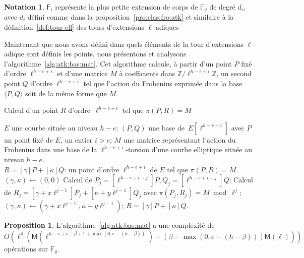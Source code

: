 \documentclass[10pt,a4paper]{book}
\theoremstyle{plain}
\theoremstyle{definition}
\theoremstyle{definition}
\theoremstyle{definition}
\theoremstyle{definition}
\newtheorem{prop}[thm]{Proposition}
\theoremstyle{definition}
\theoremstyle{remark}
\theoremstyle{remark}
\theoremstyle{definition}
\newtheorem{nota}[thm]{Notation}
\begin{document}
\begin{nota}
$\mathsf{F}_i$ représente la plus petite extension de corps de 
$\mathbb{F}_q$ de degré $d_i$, avec $d_i$ défini comme dans la 
proposition~\ref{pro:clas:fro:atk} et similaire à la 
définition~\ref{def:tour-ell} des tours d'extensions $\ell$-adiques
\end{nota}

Maintenant que nous avons défini dans quels éléments de la tour d'extensions 
$\ell$-adique sont définis les points, nous 
présentons et analysons l'algorithme~\ref{alg:atk:bas:mat}. Cet algorithme 
calcule, à partir d'un point $P$ fixé d'ordre $\ell^{h-e+i}$ et d'une matrice 
$M$ à coefficients dans $\mathbb{Z}/\ell^{h-e+i} \mathbb{Z}$, un second point 
$Q$ d'ordre $\ell^{h-e+i}$ tel que l'action du Frobenius exprimée dans la base 
$\langle P,Q \rangle$ soit de la même forme que $M$.

\begin{algorithm}
\caption{\label{alg:atk:bas:mat}Calcul d'un point $R$ d'ordre~$\ell^{h-e+i}$ tel que $\pi(P,R)=M$}
\begin{algorithmic}[1]
\REQUIRE $E$ une courbe située au niveau $h-e$; $(P, Q)$ une base de~$E[\ell^{h-e+i}]$ avec $P$ un point fixé de $E$, un entier $i > e$; $M$ une matrice représentant l'action du Frobenius dans une base de la $\ell^{h-e+i}$-torsion d'une courbe elliptique située au niveau $h-e$.\\
\ENSURE $R=[\gamma]P+ [\kappa]Q $: un point d'ordre $\ell^{h-e+i}$ de $E$ tel que $\pi(P,R)=M$.
\STATE $(\gamma, \kappa ) \leftarrow (0,0)$
\STATE Calcul de $P_j=[\ell^{h-e+i-j}]P, Q_j=[\ell^{h-e+i-j}]Q$; \label{alg:atk:bas:niv}
\STATE Calcul de $R_j=[\gamma + x\ell^{j-1}]P_j+[\kappa +y\ell^{j-1}]Q_j$ avec $\pi(P_j,R_j)=M\bmod \ell^{j}$; \label{alg:atk:coef:int}
\STATE $(\gamma, \kappa) \leftarrow (\gamma + x\ell^{j-1}, \kappa +y\ell^{j-1})$;
\ENDFOR
\RETURN\label{alg:atk:horizontal:final} $R =[\gamma]P+ [\kappa]Q$. 
\end{algorithmic}
\end{algorithm}

\begin{prop}
\label{pro:atk:comp:alg}
L'algorithme~\ref{alg:atk:bas:mat} a une complexité de 
\[
O(\ell^4(\mathsf{M}(\ell^{h-e+i-\beta+1+\max(0,e-(h-\beta))})+(\beta-\max(0,e-(h-\beta)))\mathsf{M}(\ell)))
\]
opérations sur $\mathbb{F}_q$.
\end{prop}
\end{document}
